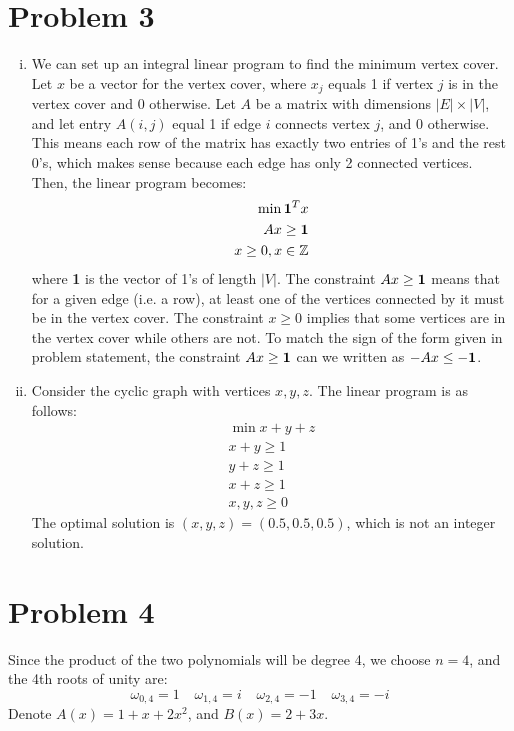 \documentclass{article}
\begin{document}
\pagebreak
\section*{Problem 3}
\begin{enumerate}[(i)]
\item We can set up an integral linear program to find the minimum vertex cover. Let $x$ be a vector for the vertex cover, where $x_j$ equals 1 if vertex $j$ is in the vertex cover and 0 otherwise. Let $A$ be a matrix with dimensions $|E|\times |V|$, and let entry $A(i,j)$ equal 1 if edge $i$ connects vertex $j$, and 0 otherwise. This means each row of the matrix has exactly two entries of 1's and the rest 0's, which makes sense because each edge has only 2 connected vertices. Then, the linear program becomes:
\begin{align*}
\min {\bf 1}^T x \\
Ax \geq {\bf 1} \\
x \geq 0, x\in \mathbb{Z}
\end{align*}
where {\bf 1} is the vector of 1's of length $|V|$. The constraint $Ax\geq {\bf 1}$ means that for a given edge (i.e. a row), at least one of the vertices connected by it must be in the vertex cover. The constraint $x\geq 0$ implies that some vertices are in the vertex cover while others are not. To match the sign of the form given in problem statement, the constraint $Ax\geq {\bf 1}$ can we written as $-Ax\leq -{\bf 1}$.


\item Consider the cyclic graph with vertices $x,y,z$. The linear program is as follows:
\begin{align*}
\min x+y+z \\
x+y \geq 1 \\
y+z \geq 1 \\
x+z \geq 1 \\
x,y,z \geq 0
\end{align*}
The optimal solution is $(x,y,z) = (0.5, 0.5, 0.5)$, which is not an integer solution.
\end{enumerate}




\pagebreak
\section*{Problem 4}
Since the product of the two polynomials will be degree 4, we choose $n=4$, and the 4th roots of unity are:
$$
\omega_{0,4} = 1 \,\,\,\,\,\ 
\omega_{1,4} = i \,\,\,\,\,\ 
\omega_{2,4} = -1 \,\,\,\,\,\
\omega_{3,4} = -i$$
Denote $A(x)=1+x+2x^2$, and $B(x) = 2+3x$. 
\end{document}
